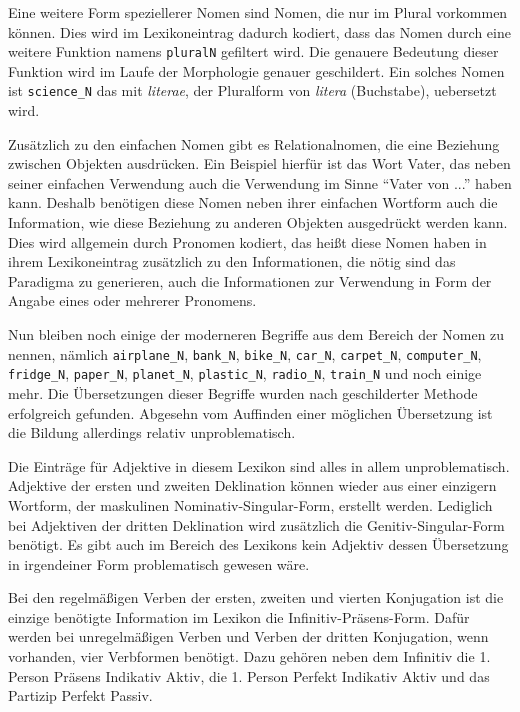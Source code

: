 \documentclass[12pt,abstract=on,titlepage,bibliography=totoc,ngerman,listof=totoc]{scrreprt}
\begin{document}
Eine weitere Form speziellerer Nomen sind Nomen, die nur im Plural vorkommen können. Dies wird im Lexikoneintrag dadurch kodiert, dass das Nomen durch eine weitere Funktion namens \texttt{pluralN} gefiltert wird. Die genauere Bedeutung dieser Funktion wird im Laufe der Morphologie genauer geschildert. Ein solches Nomen ist \texttt{science\_N} das mit \textit{literae}, der Pluralform von \textit{litera} (Buchstabe), uebersetzt wird. \par
Zusätzlich zu den einfachen Nomen gibt es Relationalnomen, die eine Beziehung zwischen Objekten ausdrücken. Ein Beispiel hierfür ist das Wort Vater, das neben seiner einfachen Verwendung auch die Verwendung im Sinne ``Vater von ...'' haben kann. Deshalb benötigen diese Nomen neben ihrer einfachen Wortform auch die Information, wie diese Beziehung zu anderen Objekten ausgedrückt werden kann. Dies wird allgemein durch Pronomen kodiert, das heißt diese Nomen haben in ihrem Lexikoneintrag zusätzlich zu den Informationen, die nötig sind das Paradigma zu generieren, auch die Informationen zur Verwendung in Form der Angabe eines oder mehrerer Pronomens. \par
Nun bleiben noch einige der moderneren Begriffe aus dem Bereich der Nomen zu nennen, nämlich \texttt{airplane\_N}, \texttt{bank\_N}, \texttt{bike\_N}, \texttt{car\_N}, \texttt{carpet\_N}, \texttt{computer\_N}, \texttt{fridge\_N}, \texttt{paper\_N}, \texttt{planet\_N}, \texttt{plastic\_N}, \texttt{radio\_N}, \texttt{train\_N} und noch einige mehr. Die Übersetzungen dieser Begriffe wurden nach geschilderter Methode erfolgreich gefunden. Abgesehn vom Auffinden einer möglichen Übersetzung ist die Bildung allerdings relativ unproblematisch. \par
Die Einträge für Adjektive in diesem Lexikon sind alles in allem unproblematisch. Adjektive der ersten und zweiten Deklination können wieder aus einer einzigern Wortform, der maskulinen Nominativ-Singular-Form, erstellt werden. Lediglich bei Adjektiven der dritten Deklination wird zusätzlich die Genitiv-Singular-Form benötigt. Es gibt auch im Bereich des Lexikons kein Adjektiv dessen Übersetzung in irgendeiner Form problematisch gewesen wäre. \par
Bei den regelmäßigen Verben der ersten, zweiten und vierten Konjugation ist die einzige benötigte Information im Lexikon die Infinitiv-Präsens-Form. Dafür werden bei unregelmäßigen Verben und Verben der dritten Konjugation, wenn vorhanden, vier Verbformen benötigt. Dazu gehören neben dem Infinitiv die 1. Person Präsens Indikativ Aktiv, die 1. Person Perfekt Indikativ Aktiv und das Partizip Perfekt Passiv. \par
\end{document}
